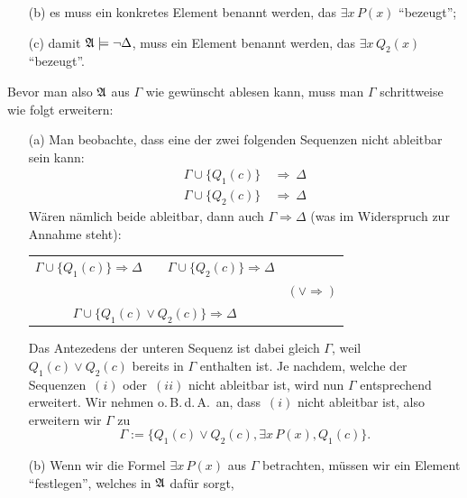 \documentclass[fontsize=11pt, twoside=false, numbers=autoenddot]{scrbook}
\begin{document}
\begin{enumerate}
\begin{enumerate}
      \item[(b)]
        es muss ein konkretes Element benannt werden, das $\exists x\,P(x)$ "`bezeugt"';
      \item[(c)]
        damit $\mathfrak{A} \models \lnot \Delta$, muss ein Element benannt werden,
        das $\exists x\,Q_2(x)$ "`bezeugt"'.
    \end{enumerate}
    Bevor man also $\mathfrak{A}$ aus $\Gamma$ wie gewünscht ablesen kann,
    muss man $\Gamma$ schrittweise wie folgt erweitern:
    \begin{enumerate}
      \item[(a)]
        Man beobachte, dass eine der zwei folgenden Sequenzen nicht ableitbar sein kann:
        \begin{align*}
          \Gamma \cup \{Q_1(c)\} & ~\Rightarrow~ \Delta \tag{$i$}\\
          \Gamma \cup \{Q_2(c)\} & ~\Rightarrow~ \Delta \tag{$ii$}
        \end{align*}
        Wären nämlich beide ableitbar, dann auch $\Gamma \Rightarrow \Delta$
        (was im Widerspruch zur Annahme steht):
        \par\smallskip
        \begin{center}
          \begin{tabular}{cl}
            $\Gamma \cup \{Q_1(c)\} \Rightarrow \Delta \qquad \Gamma \cup \{Q_2(c)\} \Rightarrow \Delta$ &                     \\[-6pt]
            \hrulefill                                                                                   & $(\lor\Rightarrow)$ \\[-2pt]
            $\Gamma \cup \{Q_1(c) \lor Q_2(c)\} \Rightarrow \Delta$                                      &
          \end{tabular}
        \end{center}
        \par\smallskip
        Das Antezedens der unteren Sequenz ist dabei gleich $\Gamma$,
        weil $Q_1(c) \lor Q_2(c)$ bereits in $\Gamma$ enthalten ist.
        Je nachdem, welche der Sequenzen~$(i)$ oder~$(ii)$ nicht ableitbar ist,
        wird nun $\Gamma$ entsprechend erweitert.
        Wir nehmen o.\,B.\,d.\,A.\ an, dass~$(i)$ nicht ableitbar ist,
        also erweitern wir $\Gamma$ zu
        \[
          \Gamma := \{Q_1(c) \lor Q_2(c), \exists x\,P(x), Q_1(c)\}.
        \]
      \item[(b)]
        Wenn wir die Formel $\exists x\,P(x)$ aus $\Gamma$ betrachten,
        müssen wir ein Element "`festlegen"', welches in $\mathfrak{A}$ dafür sorgt,

\end{enumerate}
\end{enumerate}
\end{document}
